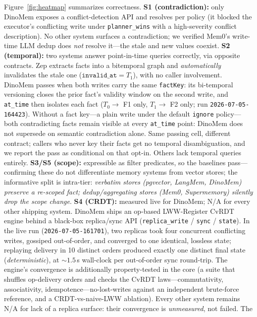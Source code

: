 \documentclass[11pt]{article}
\begin{document}
Figure~\ref{fig:heatmap} summarizes correctness. \textbf{S1 (contradiction):} only
DinoMem exposes a conflict-detection API and resolves per policy (it blocked the
executor's conflicting write under \texttt{planner\_wins} with a high-severity
conflict description). No other system surfaces a contradiction; we verified Mem0's
write-time LLM dedup does \emph{not} resolve it---the stale and new values coexist.
\textbf{S2 (temporal):} two systems answer point-in-time queries correctly, via
opposite contracts. Zep extracts facts into a bitemporal graph and
\emph{automatically} invalidates the stale one ($\texttt{invalid\_at}=T_1$), with no
caller involvement. DinoMem passes when both writes carry the same \texttt{factKey}:
its bi-temporal versioning closes the prior fact's validity window on the second
write, and \texttt{at\_time} then isolates each fact ($T_0 \to$ F1 only, $T_1 \to$
F2 only; run \texttt{2026-07-05-164423}). Without a fact key---a plain write under
the default \texttt{ignore} policy---both contradicting facts remain visible at
every \texttt{at\_time} point: DinoMem does not supersede on semantic contradiction
alone. Same passing cell, different contract; callers who never key their facts get
no temporal disambiguation, and we report the pass as conditional on that opt-in.
Others lack temporal queries entirely. \textbf{S3/S5 (scope):} expressible as filter
predicates, so the baselines pass---confirming these do not differentiate memory
systems from vector stores; the informative split is intra-tier: \emph{verbatim
stores (pgvector, LangMem, DinoMem) preserve a re-scoped fact; dedup/aggregating
stores (Mem0, Supermemory) silently drop the scope change}. \textbf{S4 (CRDT):}
measured live for DinoMem; N/A for every other shipping system. DinoMem ships an
op-based LWW-Register CvRDT engine behind a black-box replica/sync API
(\texttt{replica\_write} / \texttt{sync} / \texttt{state}). In the live run
(\texttt{2026-07-05-161701}), two replicas took four concurrent conflicting writes,
gossiped out-of-order, and converged to one identical, lossless state; replaying
delivery in 10 distinct orders produced exactly one distinct final state
(\emph{deterministic}), at ${\sim}1.5$\,s wall-clock per out-of-order sync
round-trip. The engine's convergence is additionally property-tested in the core (a
suite that shuffles op-delivery orders and checks the CvRDT laws---commutativity,
associativity, idempotence---no-lost-writes against an independent brute-force
reference, and a CRDT-vs-naive-LWW ablation). Every other system remains N/A for
lack of a replica surface: their convergence is \emph{unmeasured}, not failed. The
\end{document}
